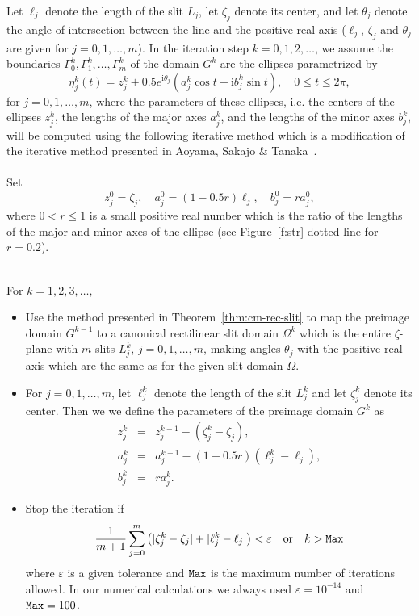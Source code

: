 \documentclass[11pt,a4paper]{article}
\renewcommand{\i}{\mathrm{i}}
\renewcommand{\i}{\mathrm{i}}
\begin{document}
Let $\ell_j$ denote the length of the slit $L_j$, let $\zeta_j$ denote its center, and let $\theta_j$ denote the angle of intersection between the line and the positive real axis ($\ell_j$, $\zeta_j$ and $\theta_j$ are given for $j=0,1,\ldots,m$). In the iteration step $k=0,1,2,\ldots$, we assume the boundaries $\Gamma^k_0,\Gamma^k_1,\ldots,\Gamma^k_m$ of the domain $G^k$ are the ellipses parametrized by
\begin{equation}\label{eq:eta-k}
\eta^k_j(t)=z^k_j+0.5e^{\i\theta_j}(a^k_j\cos t-\i b^k_j\sin t), \quad 0\le t\le 2\pi, 
\end{equation}
for $j=0,1,\ldots,m$, where the parameters of these ellipses, i.e. the centers of the ellipses $z^k_j$, the lengths of the major axes $a^k_j$, and the lengths of the minor axes $b^k_j$, will be computed using the following iterative method which is a modification of the iterative method presented in Aoyama, Sakajo \& Tanaka~\cite{Aoy-Sak-Tan13}. \\
\\
Set
\[
z^0_j=\zeta_j, \quad a^0_j=(1-0.5r)\ell_j, \quad b^0_j=r a^0_j,
\]
where $0<r\le1$ is a small positive real number which is the ratio of the lengths of the major and minor axes of the ellipse (see Figure~\ref{f:str} dotted line for $r=0.2$). 

 \\
For $k=1,2,3,\ldots,$
\begin{itemize}
	\item Use the method presented in Theorem~\ref{thm:cm-rec-slit} to map the preimage domain $G^{k-1}$ to a canonical rectilinear slit domain $\Omega^k$ which is the entire $\zeta$-plane with $m$ slits $L^k_j$, $j=0,1,\ldots,m$, making angles  $\theta_j$ with the positive real axis which are the same as for the given slit domain $\Omega$.
	\item For $j=0,1,\ldots,m$, let $\ell^k_j$ denote the length of the slit $L^k_j$ and let $\zeta^k_j$ denote its center. Then we we define the parameters of the preimage domain $G^k$ as
\begin{eqnarray}
\label{eq:slt-k}
z^{k}_j &=& z^{k-1}_j-(\zeta^{k}_j-\zeta_j), \\
a^{k}_j &=& a^{k-1}_j-(1-0.5r)(\ell^{k}_j -\ell_j), \\
b^{k}_j &=& r a^{k}_j.
\end{eqnarray}
  \item Stop the iteration if 
	\[
	\frac{1}{m+1}\sum_{j=0}^{m}\left(|\zeta^{k}_j -\zeta_j|+|\ell^{k}_j -\ell_j|\right)<\varepsilon \quad{\rm or}\quad k>{\tt Max}
	\]
	where $\varepsilon$ is a given tolerance and ${\tt Max}$ is the maximum number of iterations allowed. In our
numerical calculations we always used $\varepsilon=10^{-14}$ and ${\tt Max}=100$.
\end{itemize}
\end{document}
